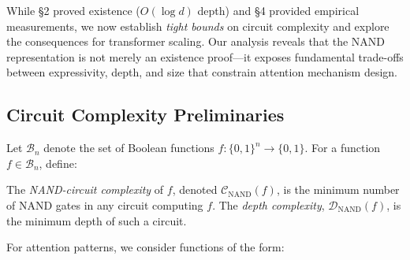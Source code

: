 While §2 proved existence ($O(\log d)$ depth) and §4 provided empirical measurements, we now establish \emph{tight bounds} on circuit complexity and explore the consequences for transformer scaling. Our analysis reveals that the NAND representation is not merely an existence proof---it exposes fundamental trade-offs between expressivity, depth, and size that constrain attention mechanism design.













\subsection{Circuit Complexity Preliminaries}













Let $\mathcal{B}_n$ denote the set of Boolean functions $f: \{0,1\}^n \to \{0,1\}$. For a function $f \in \mathcal{B}_n$, define:













\begin{definition}






The \emph{NAND-circuit complexity} of $f$, denoted $\mathcal{C}_{\text{NAND}}(f)$, is the minimum number of NAND gates in any circuit computing $f$. The \emph{depth complexity}, $\mathcal{D}_{\text{NAND}}(f)$, is the minimum depth of such a circuit.






\end{definition}













For attention patterns, we consider functions of the form:







